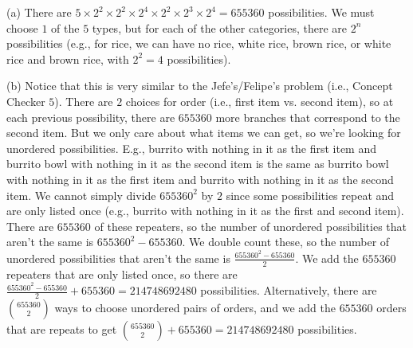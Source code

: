 \documentclass[12pt,oneside]{article}
\theoremstyle{definition}
\theoremstyle{remark}
\begin{document}
\begin{solutionbox}
(a) There are $5 \times 2^2 \times 2^2 \times 2^4 \times 2^2 \times 2^3 \times 2^4 = 655360$ possibilities. We must choose $1$ of the $5$ types, but for each of the other categories, there are $2^n$ possibilities (e.g., for rice, we can have no rice, white rice, brown rice, or white rice and brown rice, with $2^2 = 4$ possibilities).

(b) Notice that this is very similar to the Jefe's/Felipe's problem (i.e., Concept Checker $5$). There are $2$ choices for order (i.e., first item vs. second item), so at each previous possibility, there are $655360$ more branches that correspond to the second item. But we only care about what items we can get, so we're looking for unordered possibilities. E.g., burrito with nothing in it as the first item and burrito bowl with nothing in it as the second item is the same as burrito bowl with nothing in it as the first item and burrito with nothing in it as the second item. We cannot simply divide $655360^2$ by $2$ since some possibilities repeat and are only listed once (e.g., burrito with nothing in it as the first and second item). There are $655360$ of these repeaters, so the number of unordered possibilities that aren't the same is $655360^2 - 655360$. We double count these, so the number of unordered possibilities that aren't the same is $\frac{655360^2 - 655360}{2}$. We add the $655360$ repeaters that are only listed once, so there are $\frac{655360^2 - 655360}{2} + 655360 = 214748692480$ possibilities. Alternatively, there are $\binom{655360}{2}$ ways to choose unordered pairs of orders, and we add the $655360$ orders that are repeats to get $\binom{655360}{2} + 655360 = 214748692480$ possibilities.
\end{solutionbox}
\end{document}
